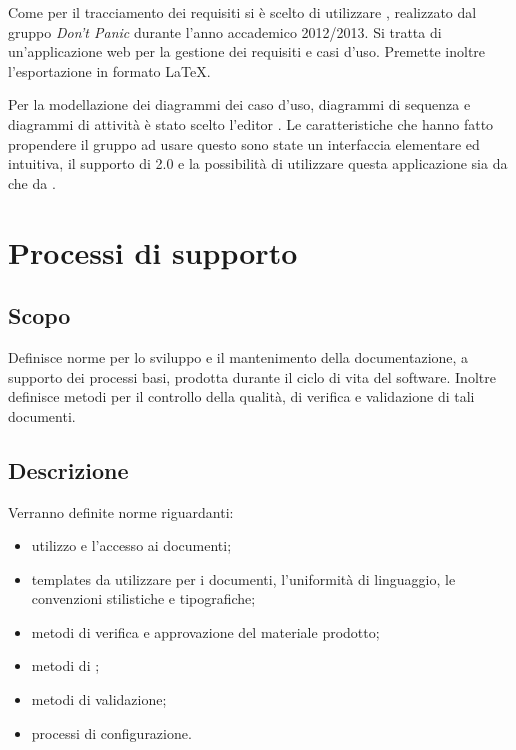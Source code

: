 \documentclass[12pt,a4paper]{article}
\begin{document}
Come  per il tracciamento dei requisiti si è scelto di utilizzare , realizzato dal gruppo \textit{Don’t Panic} durante l’anno accademico 2012/2013. Si tratta di un’applicazione web per la gestione dei requisiti e casi d’uso. Premette inoltre l’esportazione in formato \LaTeX{}.



Per la modellazione dei diagrammi dei caso d’uso, diagrammi di sequenza e diagrammi di attività è stato scelto l’editor . Le caratteristiche che hanno fatto propendere il gruppo ad usare questo  sono state un interfaccia elementare ed intuitiva, il supporto di 2.0 e la possibilità di utilizzare questa applicazione sia da  che da .

\newpage

\section{Processi di supporto}

\subsection{Scopo}
Definisce norme per lo sviluppo e il mantenimento della documentazione, a supporto dei processi basi, prodotta durante il ciclo di vita del software. Inoltre definisce metodi per il controllo della qualità, di verifica e validazione di tali documenti.

\subsection{Descrizione}
Verranno definite norme riguardanti:
\begin{itemize}
	\item utilizzo e l'accesso ai documenti;
	\item templates da utilizzare per i documenti, l'uniformità di linguaggio, le convenzioni stilistiche e tipografiche;
	\item metodi di verifica e approvazione del materiale prodotto;
	\item metodi di ;
	\item metodi di validazione;
	\item processi di configurazione.
\end{itemize}
\end{document}
